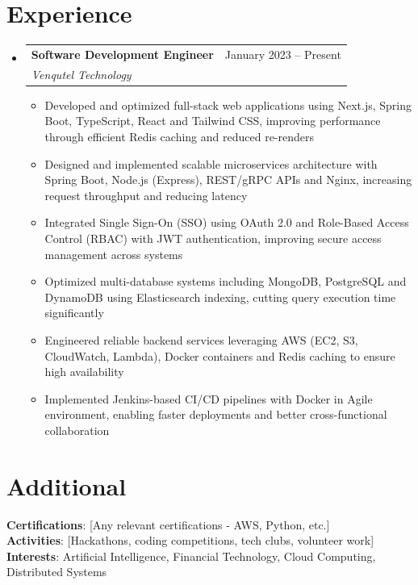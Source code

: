 \documentclass[letterpaper,11pt]{article}
\makeatletter
\newcommand{\resumeItem}[1]{
  \item\small{
    {#1 \vspace{-2pt}}
  }
}
\newcommand{\resumeSubheading}[4]{
  \vspace{-2pt}\item
    \begin{tabular*}{0.97\textwidth}[t]{l@{\extracolsep{\fill}}r}
      \textbf{#1} & #2 \\
      \textit{\small#3} & \textit{\small #4} \\
    \end{tabular*}\vspace{-7pt}
}
\newcommand{\resumeSubHeadingListStart}{\begin{itemize}[leftmargin=0.15in, label={}]}
\newcommand{\resumeSubHeadingListEnd}{\end{itemize}}
\newcommand{\resumeItemListStart}{\begin{itemize}}
\newcommand{\resumeItemListEnd}{\end{itemize}\vspace{-5pt}}
\makeatother
\begin{document}
\section{Experience}
  \resumeSubHeadingListStart
    \resumeSubheading
      {Software Development Engineer}{January 2023 -- Present}
      {Venqutel Technology}{}
      \resumeItemListStart
        \resumeItem{Developed and optimized full-stack web applications using Next.js, Spring Boot, TypeScript, React and Tailwind CSS, improving performance through efficient Redis caching and reduced re-renders}
        \resumeItem{Designed and implemented scalable microservices architecture with Spring Boot, Node.js (Express), REST/gRPC APIs and Nginx, increasing request throughput and reducing latency}
        \resumeItem{Integrated Single Sign-On (SSO) using OAuth 2.0 and Role-Based Access Control (RBAC) with JWT authentication, improving secure access management across systems}
        \resumeItem{Optimized multi-database systems including MongoDB, PostgreSQL and DynamoDB using Elasticsearch indexing, cutting query execution time significantly}
        \resumeItem{Engineered reliable backend services leveraging AWS (EC2, S3, CloudWatch, Lambda), Docker containers and Redis caching to ensure high availability}
        \resumeItem{Implemented Jenkins-based CI/CD pipelines with Docker in Agile environment, enabling faster deployments and better cross-functional collaboration}
      \resumeItemListEnd
  \resumeSubHeadingListEnd

\section{Additional}
 \begin{itemize}[leftmargin=0.15in, label={}]
    \small{\item{
     \textbf{Certifications}{: [Any relevant certifications - AWS, Python, etc.]} \\
     \textbf{Activities}{: [Hackathons, coding competitions, tech clubs, volunteer work]} \\
     \textbf{Interests}{: Artificial Intelligence, Financial Technology, Cloud Computing, Distributed Systems}
    }}
 \end{itemize}

\end{document}
